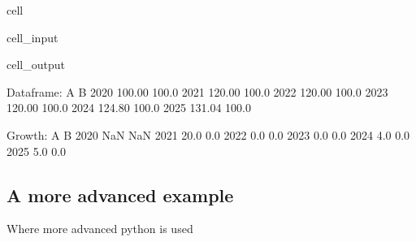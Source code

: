 \documentclass[letterpaper,10pt,english]{jupyterBook}
\begin{document}
\begin{sphinxuseclass}{cell}\begin{sphinxVerbatimInput}

\begin{sphinxuseclass}{cell_input}
\begin{sphinxVerbatim}[commandchars=\\\{\}]
  
\end{sphinxVerbatim}

\end{sphinxuseclass}\end{sphinxVerbatimInput}
\begin{sphinxVerbatimOutput}

\begin{sphinxuseclass}{cell_output}
\begin{sphinxVerbatim}[commandchars=\\\{\}]
Dataframe:
           A      B
2020  100.00  100.0
2021  120.00  100.0
2022  120.00  100.0
2023  120.00  100.0
2024  124.80  100.0
2025  131.04  100.0

Growth:
         A    B
2020   NaN  NaN
2021  20.0  0.0
2022   0.0  0.0
2023   0.0  0.0
2024   4.0  0.0
2025   5.0  0.0
\end{sphinxVerbatim}

\end{sphinxuseclass}\end{sphinxVerbatimOutput}

\end{sphinxuseclass}

\subsection{A more advanced example}
\label{\detokenize{content/howto/update/model update:a-more-advanced-example}}
\sphinxAtStartPar
Where more advanced python is used
\end{document}
